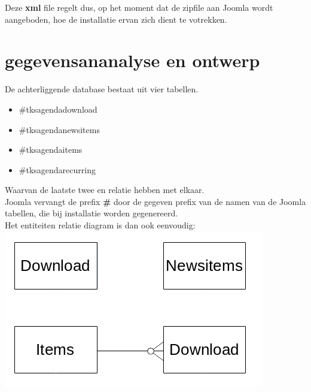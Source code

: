 \documentclass{article}
\begin{document}
Deze \textbf{xml} file regelt dus, op het moment dat de zipfile aan Joomla wordt aangeboden, hoe de installatie ervan zich dient te votrekken. \\

\newpage
\section{gegevensananalyse en ontwerp}

De achterliggende database bestaat uit vier tabellen. \\
\begin{itemize}
\item \#\textunderscore \textunderscore tks\textunderscore agenda\textunderscore download \\
\item \#\textunderscore \textunderscore tks\textunderscore agenda\textunderscore newsitems \\
\item \#\textunderscore \textunderscore tks\textunderscore agenda\textunderscore items \\
\item \#\textunderscore \textunderscore tks\textunderscore agenda\textunderscore recurring \\
\end{itemize}
Waarvan de laatste twee en relatie hebben met elkaar. \\

Joomla vervangt de prefix \textbf{\#\textunderscore \textunderscore} door de gegeven prefix van de 
namen van de Joomla tabellen, die bij installatie worden gegenereerd. \\

Het entiteiten relatie diagram is dan ook eenvoudig: \\

\includegraphics{erd}
\end{document}
